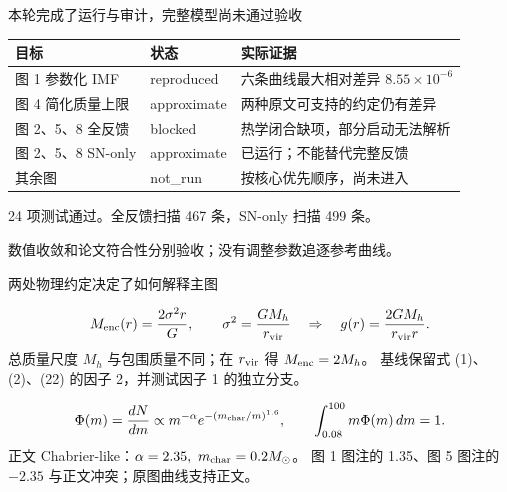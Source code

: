 \documentclass[aspectratio=169,10pt]{beamer}
\begin{document}
\begin{frame}[t]{本轮完成了运行与审计，完整模型尚未通过验收}
\par
\begin{tabular}{lll}
\toprule 目标 & 状态 & 实际证据\\\midrule
图 1 参数化 IMF & reproduced & 六条曲线最大相对差异 $8.55\times10^{-6}$\\
图 4 简化质量上限 & approximate & 两种原文可支持的约定仍有差异\\
图 2、5、8 全反馈 & blocked & 热学闭合缺项，部分启动无法解析\\
图 2、5、8 SN-only & approximate & 已运行；不能替代完整反馈\\
其余图 & not\_run & 按核心优先顺序，尚未进入\\\bottomrule
\end{tabular}

24 项测试通过。全反馈扫描 467 条，SN-only 扫描 499 条。

数值收敛和论文符合性分别验收；没有调整参数追逐参考曲线。
\end{frame}
\begin{frame}[t]{两处物理约定决定了如何解释主图}
\par
\[ M_{\rm enc}(r)=\frac{2\sigma^2r}{G},\qquad \sigma^2=\frac{GM_h}{r_{\rm vir}}
\quad\Rightarrow\quad g(r)=\frac{2GM_h}{r_{\rm vir}r}.\]
总质量尺度 $M_h$ 与包围质量不同；在 $r_{\rm vir}$ 得 $M_{\rm enc}=2M_h$。
基线保留式 (1)、(2)、(22) 的因子 2，并测试因子 1 的独立分支。

\[ \Phi(m)=\frac{dN}{dm}\propto m^{-\alpha}e^{-(m_{\rm char}/m)^{1.6}},
\qquad\int_{0.08}^{100}m\Phi(m)\,dm=1.\]
正文 Chabrier-like：$\alpha=2.35,\ m_{\rm char}=0.2M_\odot$。
图 1 图注的 1.35、图 5 图注的 $-2.35$ 与正文冲突；原图曲线支持正文。
\end{frame}
\end{document}
